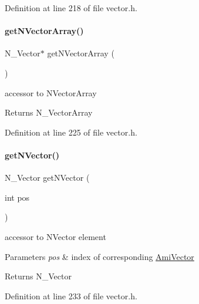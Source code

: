 Definition at line 218 of file vector.\+h.

\mbox{\label{classamici_1_1_ami_vector_array_a5ccad03e89676a4b404322899579f961}} 
\paragraph{\texorpdfstring{getNVectorArray()}{getNVectorArray()}}
{\footnotesize\ttfamily N\+\_\+\+Vector$\ast$ get\+N\+Vector\+Array (\begin{DoxyParamCaption}{ }\end{DoxyParamCaption})}

accessor to N\+Vector\+Array \begin{DoxyReturn}{Returns}
N\+\_\+\+Vector\+Array 
\end{DoxyReturn}


Definition at line 225 of file vector.\+h.

\mbox{\label{classamici_1_1_ami_vector_array_a387bfb58f20388d99da7f946a3a27ab8}} 
\paragraph{\texorpdfstring{getNVector()}{getNVector()}}
{\footnotesize\ttfamily N\+\_\+\+Vector get\+N\+Vector (\begin{DoxyParamCaption}\item[{int}]{pos }\end{DoxyParamCaption})}

accessor to N\+Vector element 
\begin{DoxyParams}{Parameters}
{\em pos} & index of corresponding \mbox{\hyperlink{classamici_1_1_ami_vector}{Ami\+Vector}} \\
\hline
\end{DoxyParams}
\begin{DoxyReturn}{Returns}
N\+\_\+\+Vector 
\end{DoxyReturn}


Definition at line 233 of file vector.\+h.

\mbox{\label{classamici_1_1_ami_vector_array_a337287b17e675970226a55ae63ad65a2}} 
